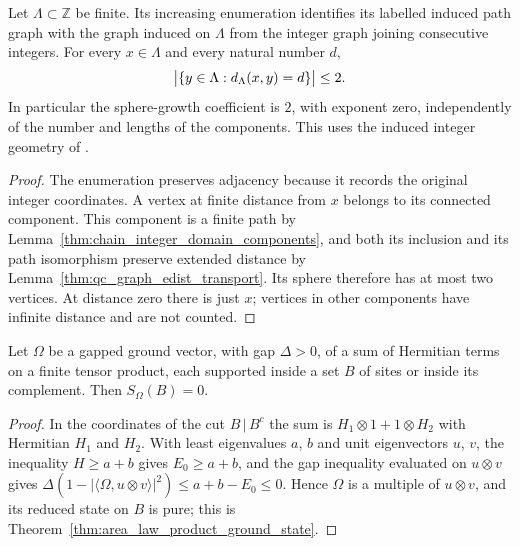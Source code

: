 \begin{lemma}
    \label{thm:domain_graph_spheres}
    \leanok
    Let $\Lambda\subset\mathbb Z$ be finite. Its increasing enumeration
    identifies its labelled induced path graph with the graph induced on
    $\Lambda$ from the integer graph joining consecutive integers.
    For every $x\in\Lambda$ and every natural number $d$,
    \begin{align}
        \bigl|\{y\in\Lambda:d_\Lambda(x,y)=d\}\bigr|\le2.\notag
    \end{align}
    In particular the sphere-growth coefficient is $2$, with exponent zero,
    independently of the number and lengths of the components.
    This uses the induced integer geometry of
    \cite[Part~I]{TNLean2026OneDimensional}.
\end{lemma}
\begin{proof}
    \leanok
    The enumeration preserves adjacency because it records the original
    integer coordinates. A vertex at finite distance from $x$ belongs to
    its connected component. This component is a finite path by
    Lemma~\ref{thm:chain_integer_domain_components}, and both its inclusion
    and its path isomorphism preserve extended distance by
    Lemma~\ref{thm:qc_graph_edist_transport}. Its sphere therefore has at
    most two vertices. At distance zero there is just $x$; vertices in
    other components have infinite distance and are not counted.
\end{proof}

\begin{lemma}
    \label{lem:zero_entropy_cut}
    \leanok
    Let $\Omega$ be a gapped ground vector, with gap $\Delta>0$, of a sum of
    Hermitian terms on a finite tensor product, each supported inside a set $B$
    of sites or inside its complement. Then $S_\Omega(B)=0$.
\end{lemma}
\begin{proof}
    \leanok
    In the coordinates of the cut $B\,|\,B^c$ the sum is
    $H_1\otimes1+1\otimes H_2$ with Hermitian $H_1$ and $H_2$. With least
    eigenvalues $a$, $b$ and unit eigenvectors $u$, $v$, the inequality
    $H\ge a+b$ gives $E_0\ge a+b$, and the gap inequality evaluated on
    $u\otimes v$ gives $\Delta(1-|\langle\Omega,u\otimes v\rangle|^2)\le
        a+b-E_0\le0$. Hence $\Omega$ is a multiple of $u\otimes v$, and its
    reduced state on $B$ is pure; this is
    Theorem~\ref{thm:area_law_product_ground_state}.
\end{proof}

